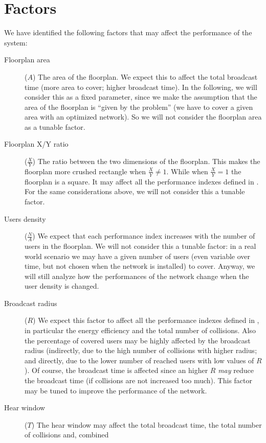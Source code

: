 \section{Factors}\label{sec:factors}

We have identified the following factors that may affect the performance of the
system:
\begin{description}
	\item[Floorplan area] (\(A\)) The area of the floorplan. We expect this
		to affect the total broadcast time (more area to cover; higher
		broadcast time). In the following, we will consider this as a
		fixed parameter, since we make the assumption that the area of
		the floorplan is ``given by the problem'' (we have to cover a
		given area with an optimized network). So we will not consider
		the floorplan area as a tunable factor.
	\item[Floorplan X/Y ratio] (\(\frac{X}{Y}\)) The ratio between the two
		dimensions of the floorplan. This makes the floorplan more
		crushed rectangle when \(\frac{X}{Y} \neq 1\). While when
		\(\frac{X}{Y} = 1\) the floorplan is a square. It may affect all
		the performance indexes defined in . For the
		same considerations above, we will not consider this a tunable
		factor.
	\item[Users density] (\(\frac{N}{A}\)) We expect that each performance
		index increases with the number of users in the floorplan. We
		will not consider this a tunable factor: in a real world
		scenario we may have a given number of users (even variable over
		time, but not chosen when the network is installed) to cover.
		Anyway, we will still analyze how the performances of the
		network change when the user density is changed.
	\item[Broadcast radius] (\(R\)) We expect this factor to affect all the
		performance indexes defined in , in
		particular the energy efficiency and the total number of
		collisions. Also the percentage of covered users may be highly
		affected by the broadcast radius (indirectly, due to the high
		number of collisions with higher radius; and directly, due to
		the lower number of reached users with low values of \(R\)). Of
		course, the broadcast time is affected since an higher \(R\)
		\emph{may} reduce the broadcast time (if collisions are not
		increased too much).
		This factor may be tuned to improve the performance of the
		network.
	\item[Hear window] (\(T\)) The hear window may affect the total
		broadcast time, the total number of collisions and, combined

\end{description}

